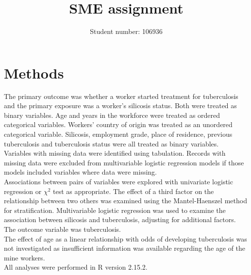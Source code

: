 \documentclass[11pt,a4paper,twoside]{article}\usepackage{graphicx, color}
\title{SME assignment}
\author{Student number: 106936}
\begin{document}
\section{Methods}
The primary outcome was whether a worker started treatment for tuberculosis and the primary exposure was a worker's silicosis status. Both were treated as binary variables. 
Age and years in the workforce were treated as ordered categorical variables. 
Workers' country of origin was treated as an unordered categorical variable. Silicosis, employment grade, place of residence, previous tuberculosis and tuberculosis status were all treated as binary variables. \\
\indent Variables with missing data were identified using tabulation. Records with missing data were excluded from multivariable logistic regression models if those models included variables where data were missing. \\
\indent Associations between pairs of variables were explored with univariate logistic regression or $\chi^2$ test as appropriate. 
The effect of a third factor on the relationship between two others was examined using the Mantel-Haenszel method for stratification.
Multivariable logistic regression was used to examine the association between silicosis and tuberculosis, adjusting for additional factors. The outcome variable was tuberculosis. \\ \indent
The effect of age as a linear relationship with odds of developing tuberculosis was not investigated as insufficient information was available regarding the age of the mine workers.\\ \indent 
All analyses were performed in R version 2.15.2.\\
\end{document}
